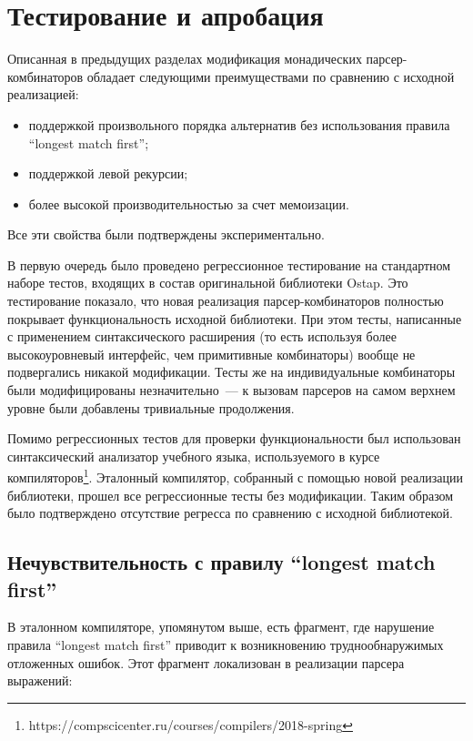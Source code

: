 \documentclass[conference]{IEEEtran}
\begin{document}
\section{Тестирование и апробация}

Описанная в предыдущих разделах модификация монадических парсер-комбинаторов обладает следующими преимуществами по сравнению с исходной реализацией:

\begin{itemize}
  \item поддержкой произвольного порядка альтернатив без использования правила ``longest match first'';
  \item поддержкой левой рекурсии;
  \item более высокой производительностью за счет мемоизации.
\end{itemize}

Все эти свойства были подтверждены экспериментально.

В первую очередь было проведено регрессионное тестирование на стандартном наборе тестов, входящих в состав оригинальной библиотеки Ostap. Это тестирование показало,
что новая реализация парсер-комбинаторов полностью покрывает функциональность исходной библиотеки. При этом тесты, написанные с применением синтаксического расширения (то есть
используя более высокоуровневый интерфейс, чем примитивные комбинаторы) вообще не подвергались никакой модификации. Тесты же на индивидуальные комбинаторы были модифицированы
незначительно~--- к вызовам парсеров на самом верхнем уровне были добавлены тривиальные продолжения.

Помимо регрессионных тестов для проверки функциональности был использован синтаксический анализатор учебного языка, используемого в курсе
компиляторов\footnote{https://compscicenter.ru/courses/compilers/2018-spring}. Эталонный компилятор, собранный с помощью новой реализации библиотеки, прошел все
регрессионные тесты без модификации. Таким образом было подтверждено отсутствие регресса по сравнению с исходной библиотекой.

\subsection{Нечувствительность с правилу ``longest match first''}

В эталонном компиляторе, упомянутом выше, есть фрагмент, где нарушение правила ``longest match first'' приводит к возникновению труднообнаружимых отложенных ошибок.
Этот фрагмент локализован в реализации парсера выражений:
\end{document}

